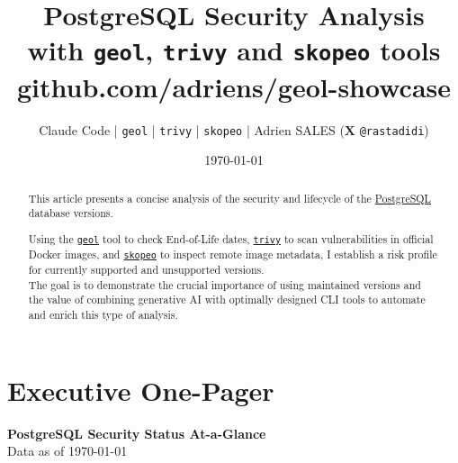 \documentclass[11pt, a4paper]{article}
\title{PostgreSQL Security Analysis\\ \large with \texttt{geol}, \texttt{trivy} and \texttt{skopeo} tools \\ github.com/adriens/geol-showcase}
\author{Claude Code | \texttt{geol} | \texttt{trivy} | \texttt{skopeo} | Adrien SALES ($\mathbf{X}$ \texttt{@rastadidi})}
\date{\today}
\begin{document}
\maketitle

\begin{abstract}
This article presents a concise analysis of the security and lifecycle of
the \href{https://www.postgresql.org/}{PostgreSQL} database versions.

Using the \href{https://github.com/opt-nc/geol}{\texttt{geol}} tool to check End-of-Life dates, \href{https://trivy.dev/}{\texttt{trivy}} to scan vulnerabilities in official Docker images, and \href{https://github.com/containers/skopeo}{\texttt{skopeo}} to inspect remote image metadata, I establish a risk profile for currently supported and unsupported versions.\\

The goal is to demonstrate the crucial importance of using maintained versions and the value of combining generative AI with optimally designed CLI tools to automate and enrich this type of analysis.
\end{abstract}

\tableofcontents
\newpage

\section*{Executive One-Pager}

\begin{center}
\Large\textbf{PostgreSQL Security Status At-a-Glance}\\
\normalsize Data as of \today
\end{center}

\vspace{0.5cm}
\end{document}
